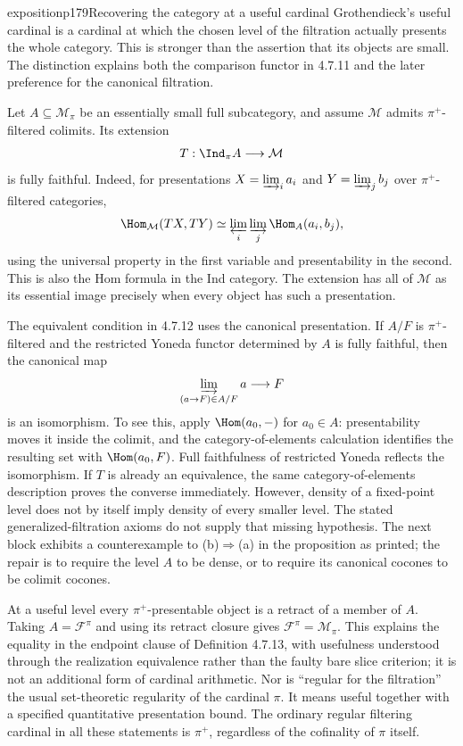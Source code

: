 \begin{dcomment}{exposition}{p179}{Recovering the category at a useful cardinal}
Grothendieck's useful cardinal is a cardinal at which the chosen level of the filtration actually presents the whole category. This is stronger than the assertion that its objects are small. The distinction explains both the comparison functor in 4.7.11 and the later preference for the canonical filtration.

Let $A\subseteq\mathcal M_\pi$ be an essentially small full subcategory, and assume $\mathcal M$ admits $\pi^+$-filtered colimits. Its extension
\[
 T:\Ind_\pi A\longrightarrow\mathcal M
\]
is fully faithful. Indeed, for presentations $X=\varinjlim_i a_i$ and $Y=\varinjlim_j b_j$ over $\pi^+$-filtered categories,
\[
 \Hom_{\mathcal M}(TX,TY)
 \simeq \varprojlim_i\varinjlim_j\Hom_A(a_i,b_j),
\]
using the universal property in the first variable and presentability in the second. This is also the Hom formula in the Ind category. The extension has all of $\mathcal M$ as its essential image precisely when every object has such a presentation.

The equivalent condition in 4.7.12 uses the canonical presentation. If $A/F$ is $\pi^+$-filtered and the restricted Yoneda functor determined by $A$ is fully faithful, then the canonical map
\[
 \varinjlim_{(a\to F)\in A/F}a\longrightarrow F
\]
is an isomorphism. To see this, apply $\Hom(a_0,-)$ for $a_0\in A$: presentability moves it inside the colimit, and the category-of-elements calculation identifies the resulting set with $\Hom(a_0,F)$. Full faithfulness of restricted Yoneda reflects the isomorphism. If $T$ is already an equivalence, the same category-of-elements description proves the converse immediately. However, density of a fixed-point level does not by itself imply density of every smaller level. The stated generalized-filtration axioms do not supply that missing hypothesis. The next block exhibits a counterexample to (b)$\Rightarrow$(a) in the proposition as printed; the repair is to require the level $A$ to be dense, or to require its canonical cocones to be colimit cocones.

At a useful level every $\pi^+$-presentable object is a retract of a member of $A$. Taking $A=\mathcal F^\pi$ and using its retract closure gives $\mathcal F^\pi=\mathcal M_\pi$. This explains the equality in the endpoint clause of Definition 4.7.13, with usefulness understood through the realization equivalence rather than the faulty bare slice criterion; it is not an additional form of cardinal arithmetic. Nor is ``regular for the filtration'' the usual set-theoretic regularity of the cardinal $\pi$. It means useful together with a specified quantitative presentation bound. The ordinary regular filtering cardinal in all these statements is $\pi^+$, regardless of the cofinality of $\pi$ itself.


\end{dcomment}
